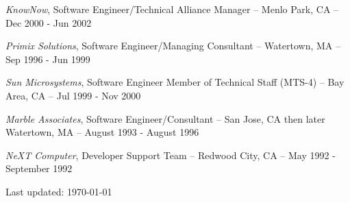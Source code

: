 \documentclass[letterpaper]{article}
\renewenvironment{itemize}{
  \begin{list}{}{
    \setlength{\leftmargin}{1.5em}
  }
}{
  \end{list}
}
\begin{document}
\begin{itemize}
\item {\it KnowNow}, Software Engineer/Technical Alliance Manager -- Menlo Park, CA -- Dec 2000 - Jun 2002

\item {\it Primix Solutions}, Software Engineer/Managing Consultant -- Watertown, MA -- Sep 1996 - Jun 1999

\item {\it Sun Microsystems}, Software Engineer Member of Technical Staff (MTS-4) -- Bay Area, CA -- Jul 1999 - Nov 2000

\item {\it Marble Associates}, Software Engineer/Consultant -- San Jose, CA then later Watertown, MA -- August 1993 - August 1996

\item {\it NeXT Computer}, Developer Support Team -- Redwood City, CA -- May 1992 - September 1992

\end{itemize}

\bigskip

\begin{center}
  \begin{footnotesize}
    Last updated: \today \\
  \end{footnotesize}
\end{center}
\end{document}
